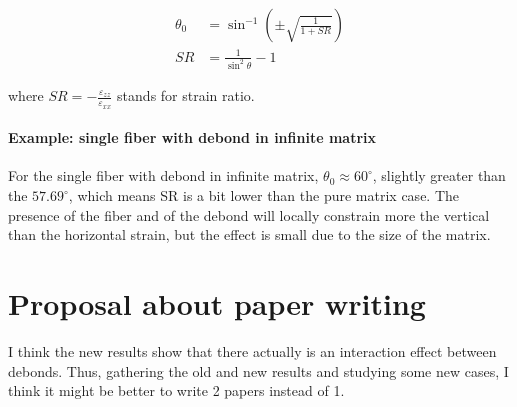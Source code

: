 \documentclass[review]{elsarticle}
\begin{document}
\begin{equation}
\begin{split}
\theta_{0}&=\sin^{-1}{\left(\pm\sqrt{\frac{1}{1+SR}}\right)}\\
SR&=\frac{1}{\sin^{2}{\theta}}-1
\end{split}
\end{equation}

where $SR=-\frac{\varepsilon_{zz}}{\varepsilon_{xx}}$ stands for strain ratio.

\paragraph{Example: single fiber with debond in infinite matrix}
For the single fiber with debond in infinite matrix, $\theta_{0}\approx60^{\circ}$, slightly greater than the $57.69^{\circ}$, which means SR is a bit lower than the pure matrix case. The presence of the fiber and of the debond will locally constrain more the vertical than the horizontal strain, but the effect is small due to the size of the matrix.

\section{Proposal about paper writing}

I think the new results show that there actually is an interaction effect between debonds. Thus, gathering the old and new results and studying some new cases, I think it might be better to write 2 papers instead of 1.
\end{document}
